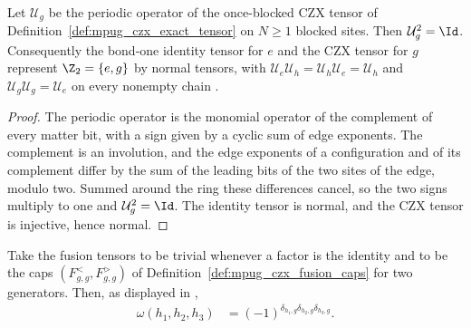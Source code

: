 \begin{lemma}
    \label{thm:mpug_czx_z2_representation}
    \leanok
    Let $\mathcal U_g$ be the periodic operator of the once-blocked CZX tensor
    of Definition~\ref{def:mpug_czx_exact_tensor} on $N\geq1$ blocked sites.
    Then $\mathcal U_g^2=\Id$. Consequently the bond-one identity tensor for
    $e$ and the CZX tensor for $g$ represent $\Z_2=\{e,g\}$ by normal
    tensors, with $\mathcal U_e\mathcal U_h=\mathcal U_h\mathcal U_e=\mathcal U_h$
    and $\mathcal U_g\mathcal U_g=\mathcal U_e$ on every nonempty chain
    \cite[lines~4503--4547]{FrancoRubio2025MPUGauging}.
\end{lemma}

\begin{proof}\leanok
    The periodic operator is the monomial operator of the complement of every
    matter bit, with a sign given by a cyclic sum of edge exponents. The
    complement is an involution, and the edge exponents of a configuration and
    of its complement differ by the sum of the leading bits of the two sites
    of the edge, modulo two. Summed around the ring these differences cancel,
    so the two signs multiply to one and $\mathcal U_g^2=\Id$. The identity
    tensor is normal, and the CZX tensor is injective, hence normal.
\end{proof}

\begin{lemma}
    \label{thm:mpug_czx_anomaly}
    \leanok
    Take the fusion tensors to be trivial whenever a factor is the identity
    and to be the caps $(F^<_{g,g},F^>_{g,g})$ of
    Definition~\ref{def:mpug_czx_fusion_caps} for two generators. Then, as
    displayed in \cite[lines~4695--4698]{FrancoRubio2025MPUGauging},
    \begin{align}
        \omega(h_1,h_2,h_3)
         & =(-1)^{\delta_{h_1,g}\delta_{h_2,g}\delta_{h_3,g}}.
        \label{eq:mpug_czx_anomaly}
    \end{align}
\end{lemma}


